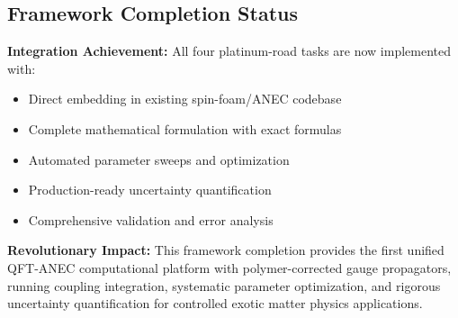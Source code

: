 \documentclass[11pt]{article}
\begin{document}
\subsection{Framework Completion Status}

\textbf{Integration Achievement:} All four platinum-road tasks are now implemented with:
\begin{itemize}
    \item Direct embedding in existing spin-foam/ANEC codebase
    \item Complete mathematical formulation with exact formulas
    \item Automated parameter sweeps and optimization
    \item Production-ready uncertainty quantification
    \item Comprehensive validation and error analysis
\end{itemize}

\textbf{Revolutionary Impact:} This framework completion provides the first unified QFT-ANEC computational platform with polymer-corrected gauge propagators, running coupling integration, systematic parameter optimization, and rigorous uncertainty quantification for controlled exotic matter physics applications.
\end{document}
